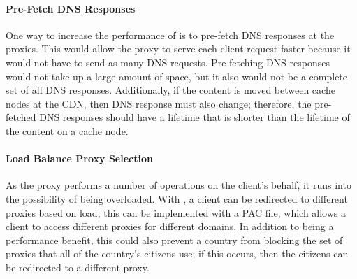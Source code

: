 \paragraph{Pre-Fetch DNS Responses} One way to increase the performance of \system{} is to pre-fetch DNS responses at 
the proxies.  This would allow the proxy to serve each client request faster because it would not have to send 
as many DNS requests.  Pre-fetching DNS responses would not take up a large amount of space, but it also 
would not be a complete set of all DNS responses.  Additionally, if the content is moved between cache nodes 
at the CDN, then DNS response must also change; therefore, the pre-fetched DNS responses should have a 
lifetime that is shorter than the lifetime of the content on a cache node.

\paragraph{Load Balance Proxy Selection} As the proxy performs a number of operations on the client's behalf, it 
runs into the possibility of being overloaded.  With \system{}, a client can be redirected to different 
proxies based on load; this can be implemented with a PAC file, which allows 
a client to access different proxies for different domains.  In addition to being a performance benefit, 
this could also prevent a country from blocking the set of proxies that all of the country's citizens use; if 
this occurs, then the citizens can be redirected to a different proxy.   

